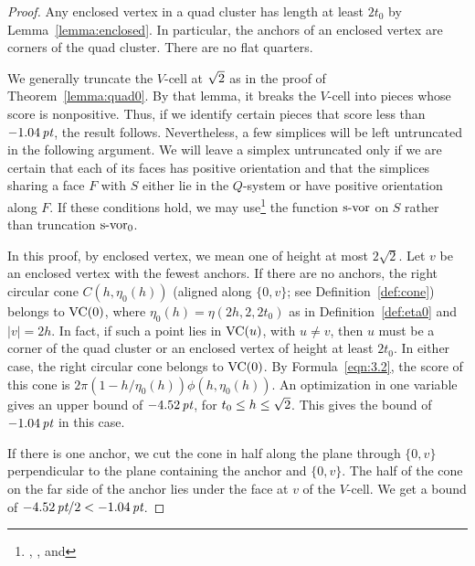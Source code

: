 \begin{proof}
Any enclosed vertex in a quad cluster has length at least $2t_0$
by Lemma~\ref{lemma:enclosed}. In particular, the anchors of an
enclosed vertex are corners of the quad cluster. There are no flat
quarters.

We generally truncate the $V$-cell at $\sqrt2$ as in the proof of
Theorem~\ref{lemma:quad0}.  By that lemma, it breaks the $V$-cell
into pieces whose score is nonpositive. Thus, if we identify
certain pieces that score less than $-1.04\,\hbox{\it pt}$, the result
follows. Nevertheless, a few simplices will be left untruncated in
the following argument. We will leave a simplex untruncated only
if we are certain that each of its faces has positive orientation
and that the simplices sharing a face $F$ with $S$ either lie in
the $Q$-system or have positive orientation along $F$.  If these
conditions hold, we may use\footnote{,
, and } the function $\operatorname{s-vor}$ on $S$
rather than truncation $\operatorname{s-vor}_0$.

In this proof, by enclosed vertex, we mean one of height at most
$2\sqrt2$. Let $v$ be an enclosed vertex with the fewest anchors.
If there are no anchors, the right circular cone $C(h,\eta_0(h))$
(aligned along $\{0,v\}$; see Definition~\ref{def:cone}) belongs
to ${\operatorname{VC}}(0)$, where $\eta_0(h)=\eta(2h,2,2t_0)$ as in
Definition~\ref{def:eta0} and $|v|=2h$. In fact, if such a point
lies in ${\operatorname{VC}}(u)$, with $u \ne v$, then $u$ must be a corner of
the quad cluster or an enclosed vertex of height at least $2t_0$.
In either case, the right circular cone belongs to ${\operatorname{VC}} (0)$.
By Formula~\ref{eqn:3.2}, the score of this cone is
$2\pi(1-h/\eta_0(h))\phi(h,\eta_0(h))$. An optimization in one
variable gives an upper bound of $-4.52\,\hbox{\it pt}$, for $t_0\le h\le
\sqrt2$.   This gives the bound of $-1.04\,\hbox{\it pt}$ in this case.

If there is one anchor,  we cut the cone in half along the plane
through $\{0,v\}$ perpendicular to the plane containing the anchor
and $\{0,v\}$. The half of the cone on the far side of the anchor
lies under the face at $v$ of the $V$-cell.  We get a bound of
$-4.52\,\hbox{\it pt}/2 < -1.04\,\hbox{\it pt}$.


\end{proof}
